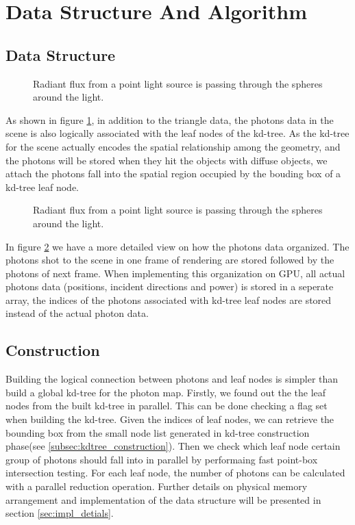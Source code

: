\section{Data Structure And Algorithm} 

\subsection{Data Structure}

\begin{figure}[htp] 
    \centering 
    \renewcommand{\thefigure}{\thechapter.\arabic{figure}}
    \caption[]{Radiant flux from a point light source is passing through the spheres around the light.}
    \label{fig:kd_leaf_photons} 
\end{figure}  

As shown in figure \ref{fig:kd_leaf_photons}, in addition to the triangle data, the photons data in the scene is also logically associated with the leaf nodes of the kd-tree. As the kd-tree for the scene actually encodes the spatial relationship among the geometry, and the photons will be stored when they hit the objects with diffuse objects, we attach the photons fall into the spatial region occupied by the bouding box of a kd-tree leaf node. 

\begin{figure}[htp] 
    \centering 
    \renewcommand{\thefigure}{\thechapter.\arabic{figure}}
    \caption[]{Radiant flux from a point light source is passing through the spheres around the light.}
    \label{fig:kd_leaf_photons_2} 
\end{figure}  

In figure \ref{fig:kd_leaf_photons_2} we have a more detailed view on how the photons data organized. The photons shot to the scene in one frame of rendering are stored followed by the photons of next frame. When implementing this organization on GPU, all actual photons data (positions, incident directions and power) is stored in a seperate array, the indices of the photons associated with kd-tree leaf nodes are stored instead of the actual photon data. 

\subsection{Construction} 

Building the logical connection between photons and leaf nodes is simpler than build a global kd-tree for the photon map. Firstly, we found out the the leaf nodes from the built kd-tree in parallel. This can be done checking a flag set when building the kd-tree. Given the indices of leaf nodes, we can retrieve the bounding box from the small node list generated in kd-tree construction phase(see \ref{subsec:kdtree_construction}). Then we check which leaf node certain group of photons should fall into in parallel by performaing fast point-box intersection testing. For each leaf node, the number of photons can be calculated with a parallel reduction operation. Further details on physical memory arrangement and implementation of the data structure  will be presented in section \ref{sec:impl_detials}. 

